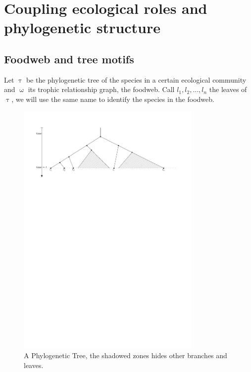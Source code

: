 \documentclass[12pt,a4paper]{report}
\begin{document}
\section{Coupling ecological roles and phylogenetic structure}

\subsection{Foodweb and tree motifs}
Let $\uptau$ be the phylogenetic tree of the species in a certain ecological community and $\upomega$ its trophic relationship graph, the foodweb. Call $l_1, l_2, \dots , l_n$ the leaves of $\uptau$, we will use the same name to identify the species in the foodweb.\begin{figure}[h]
	\centering
		\includegraphics[width=0.8\textwidth]{images/phylogeny}
		\caption{A Phylogenetic Tree, the shadowed zones hides other branches and leaves.}
		\label{fig:phylogeny}
\end{figure}
\end{document}
